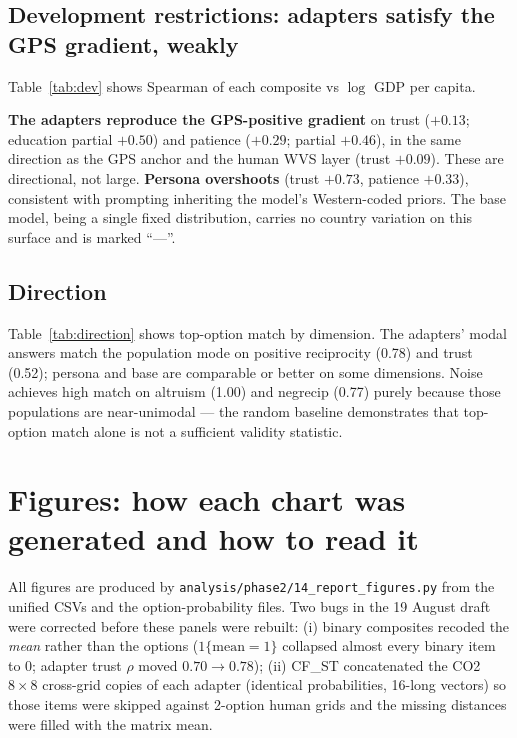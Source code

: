 \documentclass[11pt]{article}
\begin{document}
\subsection{Development restrictions: adapters satisfy the GPS gradient, weakly}
\label{sec:dev}
Table~\ref{tab:dev} shows Spearman of each composite vs $\log$ GDP per capita.

\begin{table}[ht]
\centering
\caption{Development restriction: Spearman $\rho$ of country composite vs $\log$ GDP pc (WDI 2015--2019). Human n=41 (one country missing WDI); adapter and persona layers n=16. ``---'' = undefined (single fixed distribution).}
\label{tab:dev}

\end{table}

\textbf{The adapters reproduce the GPS-positive gradient} on trust ($+0.13$; education partial $+0.50$) and patience ($+0.29$; partial $+0.46$), in the same direction as the GPS anchor and the human WVS layer (trust $+0.09$). These are directional, not large. \textbf{Persona overshoots} (trust $+0.73$, patience $+0.33$), consistent with prompting inheriting the model's Western-coded priors. The base model, being a single fixed distribution, carries no country variation on this surface and is marked ``---''.

\subsection{Direction}
\label{sec:direction}
Table~\ref{tab:direction} shows top-option match by dimension. The adapters' modal answers match the population mode on positive reciprocity (0.78) and trust (0.52); persona and base are comparable or better on some dimensions. Noise achieves high match on altruism (1.00) and negrecip (0.77) purely because those populations are near-unimodal --- the random baseline demonstrates that top-option match alone is not a sufficient validity statistic.

\begin{table}[ht]
\centering
\caption{Top-option match rate by dimension and model.}
\label{tab:direction}

\end{table}

\section{Figures: how each chart was generated and how to read it}
\label{sec:figures}
All figures are produced by \texttt{analysis/phase2/14\_report\_figures.py} from the unified CSVs and the option-probability files. Two bugs in the 19 August draft were corrected before these panels were rebuilt: (i) binary composites recoded the \emph{mean} rather than the options ($1\{\mathrm{mean}=1\}$ collapsed almost every binary item to 0; adapter trust $\rho$ moved $0.70\to 0.78$); (ii) CF\_ST concatenated the CO2 $8\times 8$ cross-grid copies of each adapter (identical probabilities, 16-long vectors) so those items were skipped against 2-option human grids and the missing distances were filled with the matrix mean.
\end{document}
